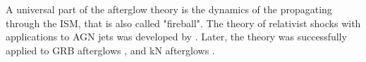 %
%
%
%
%
%
%
%
%
%

%
%
A universal part of the afterglow theory is the dynamics of the \trans{} 
\blast{} propagating through the \ac{ISM}, that is also called "fireball".
%
The theory of relativist shocks with applications to \ac{AGN} jets was 
developed by \citep{Blandford:1976}. Later, the theory was successfully 
applied to \ac{GRB} afterglows \citep{Costa:1997cg,vanParadijs:1997wr,Frail:1997qf},
and \ac{kN} afterglows \citep[\eg]{Nakar:2011cw,Hotokezaka:2015eja,Hotokezaka:2018gmo}.


